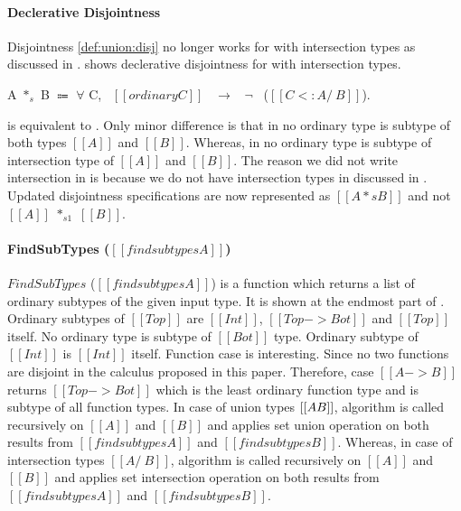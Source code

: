 \paragraph{Declerative Disjointness}
Disjointness \cref{def:union:disj} no longer works for \cal with intersection types as discussed in
. 
 shows declerative disjointness for \cal with intersection types.

\begin{definition}
\label{def:inter:disj}
  A $*_s$ B $\Coloneqq$ $\forall$ C, \ $[[ordinary C]]$ \ $\rightarrow$ \ $\neg$ \ ($[[C <: A /\ B]]$).
\end{definition}

\noindent {} is equivalent to . Only minor difference is that
in  no ordinary type is subtype of both types $[[A]]$ and $[[B]]$. Whereas,
in  no ordinary type is subtype of intersection type of $[[A]]$ and $[[B]]$.
The reason we did not write intersection in  is because we do not have
intersection types in \cal discussed in . Updated disjointness specifications are
now represented as $[[A *s B]]$ and not $[[A]]$ $*_{s1}$ $[[B]]$.

\paragraph{FindSubTypes ($[[findsubtypes A]]$)}
$FindSubTypes$ ($[[findsubtypes A]]$) is a function which returns a list of ordinary subtypes
of the given input type. It is shown at the endmost part of .
Ordinary subtypes of $[[Top]]$ are $[[Int]]$, $[[Top -> Bot]]$ and $[[Top]]$ itself.
No ordinary type is subtype of $[[Bot]]$ type. Ordinary subtype of $[[Int]]$ is $[[Int]]$ itself.
Function case is interesting. Since no two functions are disjoint in the calculus proposed in this paper.
Therefore, case $[[A -> B]]$ returns $[[Top -> Bot]]$ which is the least ordinary function type
and is subtype of all function types. In case of union types $[[A \/ B]]$, algorithm is called recursively on
$[[A]]$ and $[[B]]$ and applies set union operation on both results from  $[[findsubtypes A]]$ and
$[[findsubtypes B]]$. Whereas, in case of intersection types $[[A /\ B]]$, algorithm is called recursively on
$[[A]]$ and $[[B]]$ and applies set intersection operation on both results from  $[[findsubtypes A]]$ and
$[[findsubtypes B]]$.

